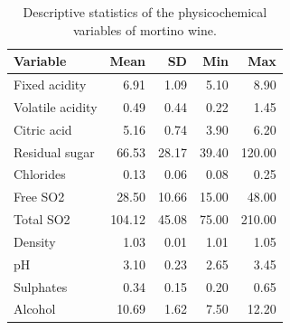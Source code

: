 \begin{table}[ht]
\centering
\begin{tabular}{lrrrr}
  \toprule
Variable & Mean & SD & Min & Max \\ 
  \midrule
Fixed acidity & 6.91 & 1.09 & 5.10 & 8.90 \\ 
  Volatile acidity & 0.49 & 0.44 & 0.22 & 1.45 \\ 
  Citric acid & 5.16 & 0.74 & 3.90 & 6.20 \\ 
  Residual sugar & 66.53 & 28.17 & 39.40 & 120.00 \\ 
  Chlorides & 0.13 & 0.06 & 0.08 & 0.25 \\ 
  Free SO2 & 28.50 & 10.66 & 15.00 & 48.00 \\ 
  Total SO2 & 104.12 & 45.08 & 75.00 & 210.00 \\ 
  Density & 1.03 & 0.01 & 1.01 & 1.05 \\ 
  pH & 3.10 & 0.23 & 2.65 & 3.45 \\ 
  Sulphates & 0.34 & 0.15 & 0.20 & 0.65 \\ 
  Alcohol & 10.69 & 1.62 & 7.50 & 12.20 \\ 
   \bottomrule
\end{tabular}
\caption{Descriptive statistics of the physicochemical variables of mortino wine.} 
\label{tab:statistics}
\end{table}
